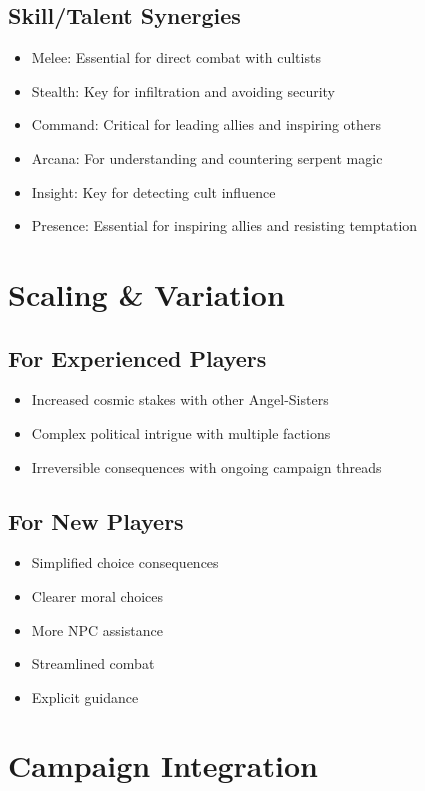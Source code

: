 \documentclass[11pt]{article}
\begin{document}
\subsection*{Skill/Talent Synergies}
\begin{itemize}
    \item Melee: Essential for direct combat with cultists
    \item Stealth: Key for infiltration and avoiding security
    \item Command: Critical for leading allies and inspiring others
    \item Arcana: For understanding and countering serpent magic
    \item Insight: Key for detecting cult influence
    \item Presence: Essential for inspiring allies and resisting temptation
\end{itemize}

\section*{Scaling \& Variation}

\subsection*{For Experienced Players}
\begin{itemize}
    \item Increased cosmic stakes with other Angel-Sisters
    \item Complex political intrigue with multiple factions
    \item Irreversible consequences with ongoing campaign threads
\end{itemize}

\subsection*{For New Players}
\begin{itemize}
    \item Simplified choice consequences
    \item Clearer moral choices
    \item More NPC assistance
    \item Streamlined combat
    \item Explicit guidance
\end{itemize}

\section*{Campaign Integration}
\end{document}
